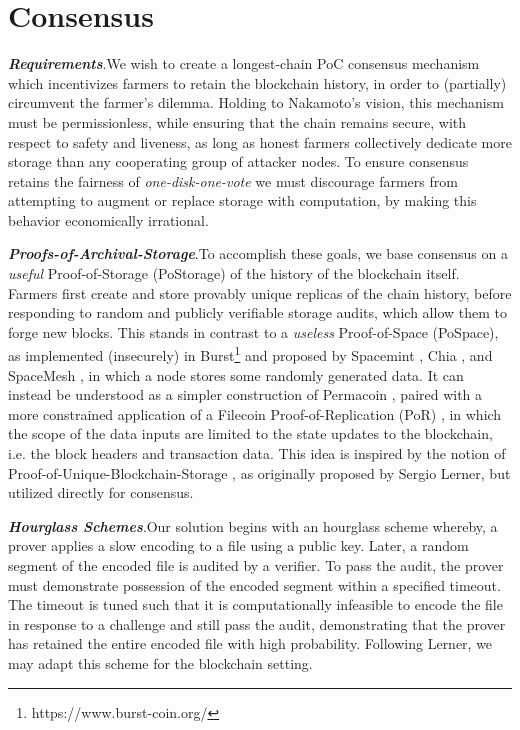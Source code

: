 \documentclass[conference]{IEEEtran}
\begin{document}
\section{Consensus}

\noindent \textbf{\textit{Requirements}}.\quad We wish to create a longest-chain PoC consensus mechanism which incentivizes farmers to retain the blockchain history, in order to (partially) circumvent the farmer’s dilemma. Holding to Nakamoto’s vision, this mechanism must be permissionless, while ensuring that the chain remains secure, with respect to safety and liveness, as long as honest farmers collectively dedicate more storage than any cooperating group of attacker nodes. To ensure consensus retains the fairness of \textit{one-disk-one-vote} we must discourage farmers from attempting to augment or replace storage with computation, by making this behavior economically irrational.

\vspace{2mm}

\noindent \textbf{\textit{Proofs-of-Archival-Storage}}.\quad To accomplish these goals, we base consensus on a \textit{useful} Proof-of-Storage (PoStorage) \cite{fisch2018poreps} of the history of the blockchain itself. Farmers first create and store provably unique replicas of the chain history, before responding to random and publicly verifiable storage audits, which allow them to forge new blocks. This stands in contrast to a \textit{useless} Proof-of-Space (PoSpace), as implemented (insecurely) in Burst\footnote{https://www.burst-coin.org/} and proposed by Spacemint \cite{park2018spacemint}, Chia \cite{cohen2019chia}, and SpaceMesh \cite{moran2019simple}, in which a node stores some randomly generated data. It can instead be understood as a simpler construction of Permacoin \cite{miller2014permacoin}, paired with a more constrained application of a Filecoin Proof-of-Replication (PoR) \cite{benet2017proof}, in which the scope of the data inputs are limited to the state updates to the blockchain, i.e. the block headers and transaction data. This idea is inspired by the notion of Proof-of-Unique-Blockchain-Storage \cite{lerner_2015}, as originally proposed by Sergio Lerner, but utilized directly for consensus.

\vspace{2mm}

\noindent \textbf{\textit{Hourglass Schemes}}.\quad Our solution begins with an hourglass scheme \cite{van2012hourglass} whereby, a prover applies a slow encoding to a file using a public key. Later, a random segment of the encoded file is audited by a verifier. To pass the audit, the prover must demonstrate possession of the encoded segment within a specified timeout. The timeout is tuned such that it is computationally infeasible to encode the file in response to a challenge and still pass the audit, demonstrating that the prover has retained the entire encoded file with high probability. Following Lerner, we may adapt this scheme for the blockchain setting.
\end{document}
